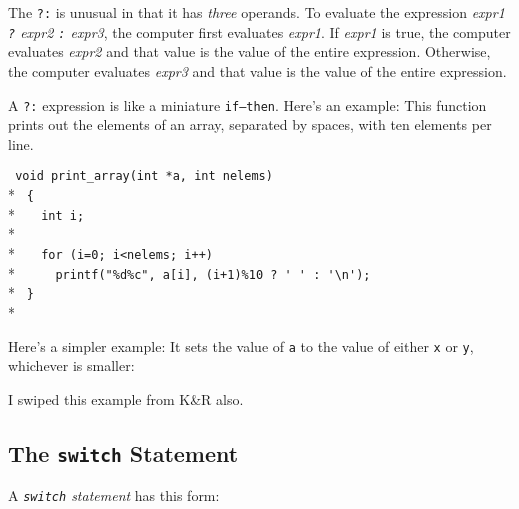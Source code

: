 The {\tt ?:} is unusual in that it has {\em three}\/ operands.  To
evaluate the expression {\em expr1 {\tt ?} expr2 {\tt :} expr3}\/, the
computer first evaluates {\em expr1}\/.  If {\em expr1} is true, the
computer evaluates {\em expr2}\/ and that value is the value of the
entire expression.  Otherwise, the computer evaluates {\em expr3}\/ and
that value is the value of the entire expression.

A {\tt ?:} expression is like a miniature {\tt if{\rm --}then}.  Here's
an example:  This function prints out the elements of an array,
separated by spaces, with ten elements per line.

\begin{flushleft}
\verb! void print_array(int *a, int nelems) ! \\*
\verb! { ! \\*
\verb!   int i; ! \\*
\verb!  ! \\*
\verb!   for (i=0; i<nelems; i++)  ! \\*
\verb!     printf("%d%c", a[i], (i+1)%10 ? ' ' : '\n'); ! \\*
\verb! } ! \\*
\end{flushleft}

Here's a simpler example:  It sets the value of {\tt a} to the value of
either {\tt x} or {\tt y}, whichever is smaller:

\begin{flushleft}
\verb%  a = (x > y) ? y : x ; %
\end{flushleft}

I swiped this example from K\&R also.

\subsection{The {\tt switch} Statement}

A {\em {\tt switch} statement}\/ has this form:

